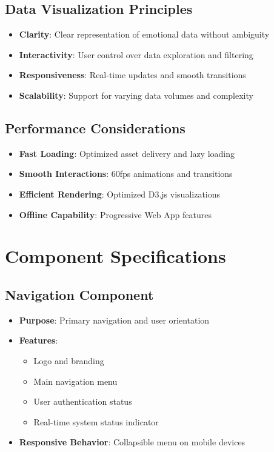 \subsection{Data Visualization Principles}
\begin{itemize}
\item \textbf{Clarity}: Clear representation of emotional data without ambiguity
\item \textbf{Interactivity}: User control over data exploration and filtering
\item \textbf{Responsiveness}: Real-time updates and smooth transitions
\item \textbf{Scalability}: Support for varying data volumes and complexity
\end{itemize}

\subsection{Performance Considerations}
\begin{itemize}
\item \textbf{Fast Loading}: Optimized asset delivery and lazy loading
\item \textbf{Smooth Interactions}: 60fps animations and transitions
\item \textbf{Efficient Rendering}: Optimized D3.js visualizations
\item \textbf{Offline Capability}: Progressive Web App features
\end{itemize}


\section{Component Specifications}

\subsection{Navigation Component}
\begin{itemize}
\item \textbf{Purpose}: Primary navigation and user orientation
\item \textbf{Features}: 
  \begin{itemize}
  \item Logo and branding
  \item Main navigation menu
  \item User authentication status
  \item Real-time system status indicator
  \end{itemize}
\item \textbf{Responsive Behavior}: Collapsible menu on mobile devices
\end{itemize}

